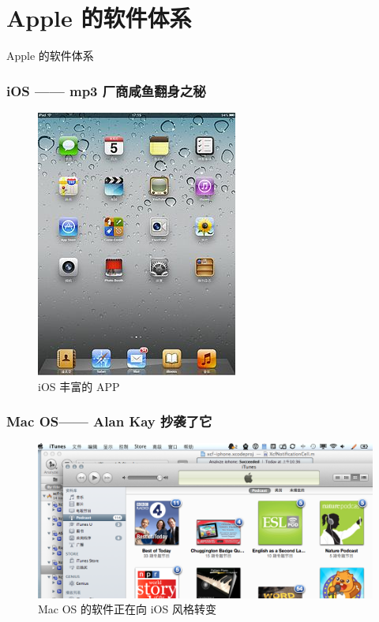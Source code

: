 \documentclass[utf8x, notes=hide]{beamer}
\begin{document}
\section{Apple 的软件体系}
\begin{frame}
\begin{center}
  \Huge{Apple 的软件体系}
\end{center}
\end{frame}
\begin{frame}
  \frametitle{iOS —— mp3 厂商咸鱼翻身之秘}
  \begin{figure}
    \centering
    \includegraphics[bb=0 0 250 333,scale=.2]{images/iossoft.jpg}
    \caption{iOS 丰富的 APP}
    \label{fig:iossoft}
  \end{figure}
\end{frame}
\begin{frame}
  \frametitle{Mac OS—— Alan Kay 抄袭了它}
  \begin{figure}
    \centering
    \includegraphics[bb=0 0 988 458,scale=.2]{images/macsoft.png}
    \caption{Mac OS 的软件正在向 iOS 风格转变}
    \label{fig:MacSoft}
  \end{figure}
\end{frame}
\end{document}
